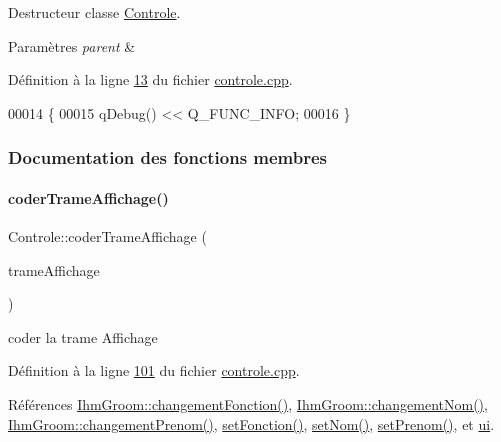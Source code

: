 Destructeur classe \hyperlink{class_controle}{Controle}. 


\begin{DoxyParams}{Paramètres}
{\em parent} & \\
\hline
\end{DoxyParams}


Définition à la ligne \hyperlink{controle_8cpp_source_l00013}{13} du fichier \hyperlink{controle_8cpp_source}{controle.\+cpp}.


\begin{DoxyCode}
00014 \{
00015     qDebug() << Q\_FUNC\_INFO;
00016 \}
\end{DoxyCode}


\subsubsection{Documentation des fonctions membres}
\mbox{\label{class_controle_a316808279226b01ac8fe51ab396b1b67}} 
\paragraph{\texorpdfstring{coder\+Trame\+Affichage()}{coderTrameAffichage()}}
{\footnotesize\ttfamily Controle\+::coder\+Trame\+Affichage (\begin{DoxyParamCaption}\item[{Q\+String}]{trame\+Affichage }\end{DoxyParamCaption})\hspace{0.3cm}{\ttfamily [private]}}



coder la trame Affichage 



Définition à la ligne \hyperlink{controle_8cpp_source_l00101}{101} du fichier \hyperlink{controle_8cpp_source}{controle.\+cpp}.



Références \hyperlink{ihmgroom_8cpp_source_l00075}{Ihm\+Groom\+::changement\+Fonction()}, \hyperlink{ihmgroom_8cpp_source_l00065}{Ihm\+Groom\+::changement\+Nom()}, \hyperlink{ihmgroom_8cpp_source_l00070}{Ihm\+Groom\+::changement\+Prenom()}, \hyperlink{controle_8cpp_source_l00092}{set\+Fonction()}, \hyperlink{controle_8cpp_source_l00075}{set\+Nom()}, \hyperlink{controle_8cpp_source_l00084}{set\+Prenom()}, et \hyperlink{controle_8h_source_l00029}{ui}.


